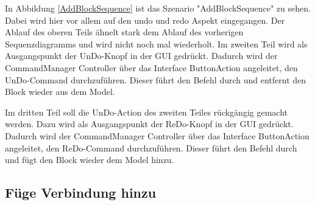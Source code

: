\documentclass[parskip=full]{scrartcl}
\begin{document}
In Abbildung \ref{AddBlockSequence} ist das Szenario "AddBlockSequence" zu sehen. Dabei wird hier vor allem auf den undo und redo Aspekt eingegangen. Der Ablauf des oberen Teils ähnelt stark dem Ablauf des vorherigen Sequenzdiagramms und wird nicht noch mal wiederholt. Im zweiten Teil wird als Ausgangspunkt der UnDo-Knopf in der GUI gedrückt. Dadurch wird der CommandManager Controller über das Interface ButtonAction angeleitet, den UnDo-Command durchzuführen. Dieser führt den Befehl durch und entfernt den Block wieder aus dem Model.

Im dritten Teil soll die UnDo-Action des zweiten Teiles rückgängig gemacht werden. Dazu wird als Ausgangspunkt der ReDo-Knopf in der GUI gedrückt. Dadurch wird der CommandManager Controller über das Interface ButtonAction angeleitet, den ReDo-Command durchzuführen. Dieser führt den Befehl durch und fügt den Block wieder dem Model hinzu.


\subsection{Füge Verbindung hinzu}
\end{document}
